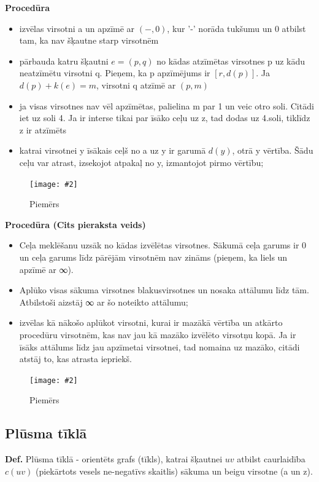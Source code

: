 \documentclass{article}
\newcommand{\illustration}[3]{
	\begin{figure}[H]
		\centering	
		\texttt{[image: \#2]}
		\caption{#3}
	\end{figure}
}
\begin{document}
\textbf{Procedūra}
\begin{itemize}
	\item izvēlas virsotni a un apzīmē ar $(−, 0)$, kur '-' norāda tukšumu un 0 atbilst tam, ka nav šķautne starp virsotnēm
	\item pārbauda katru šķautni $e = (p, q)$ no kādas atzīmētas virsotnes p uz kādu neatzīmētu virsotni q. Pieņem, ka p apzīmējums ir $[r , d(p)]$. Ja $d(p) + k(e) = m$, virsotni q atzīmē ar $(p, m)$
	\item ja visas virsotnes nav vēl apzīmētas, palielina m par 1 un veic otro soli. Citādi iet uz soli 4. Ja ir interse tikai par īsāko ceļu uz z, tad dodas uz 4.soli, tiklīdz z ir atzīmēts
	\item katrai virsotnei y īsākais ceļš no a uz y ir garumā $d(y)$, otrā y vērtība. Šādu ceļu var atrast, izsekojot atpakaļ no y, izmantojot pirmo vērtību;
\end{itemize}

\illustration{1}{daikstra-1}{Piemērs}

\textbf{Procedūra (Cits pieraksta veids)}

\begin{itemize}
	\item Ceļa meklēšanu uzsāk no kādas izvēlētas virsotnes. Sākumā ceļa garums ir 0 un ceļa garums līdz pārējām virsotnēm nav zināms (pieņem, ka liels un apzīmē ar ∞).
	\item Aplūko visas sākuma virsotnes blakusvirsotnes un nosaka attālumu līdz tām.  Atbilstoši aizstāj ∞ ar šo noteikto attālumu;
	\item izvēlas kā nākošo aplūkot virsotni, kurai ir mazākā vērtība un atkārto procedūru virsotnēm, kas nav jau kā mazāko izvēlēto virsotņu kopā. Ja ir īsāks attālums līdz jau apzīmetai virsotnei, tad nomaina uz mazāko, citādi atstāj to, kas atrasta iepriekš.
\end{itemize}
	
\illustration{1}{daikstra-2}{Piemērs}

\subsection{Plūsma tīklā}

\textbf{Def.} Plūsma tīklā - orientēts grafs (tīkls), katrai šķautnei $uv$ atbilst caurlaidība $c(uv)$ (piekārtots vesels ne-negatīvs skaitlis) sākuma un beigu virsotne (a un z).
\end{document}
